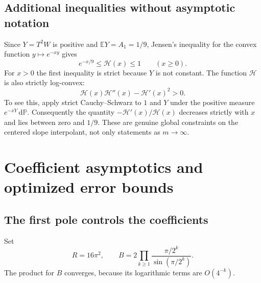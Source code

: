 \documentclass[11pt,a4paper]{article}
\numberwithin{equation}{section}
\theoremstyle{definition}
\theoremstyle{remark}
\newcommand{\E}{\mathbb E}
\newcommand{\dd}{\,\mathrm d}
\newcommand{\calH}{\mathcal H}
\begin{document}
\subsection{Additional inequalities without asymptotic notation}
Since $Y=T^2W$ is positive and $\E Y=A_1=1/9$, Jensen's inequality
for the convex function $y\mapsto e^{-xy}$ gives
\begin{equation}
 e^{-x/9}\le\calH(x)\le1\qquad(x\ge0).
 \label{eq:Jensen}
\end{equation}
For $x>0$ the first inequality is strict because $Y$ is not
constant. The function $\calH$ is also strictly log-convex:
\begin{equation}
 \calH(x)\calH''(x)-\calH'(x)^2>0.
 \label{eq:calH-logconvex}
\end{equation}
To see this, apply strict Cauchy--Schwarz to $1$ and $Y$ under the
positive measure $e^{-xY}\dd\mathbb P$. Consequently the quantity
$-\calH'(x)/\calH(x)$ decreases strictly with $x$ and lies between
zero and $1/9$. These are genuine global constraints on the centered
slope interpolant, not only statements as $m\to\infty$.

\section{Coefficient asymptotics and optimized error bounds}
\label{sec:optimal}

\subsection{The first pole controls the coefficients}
Set
\begin{equation}
 R=16\pi^2,\qquad
 B=2\prod_{k\ge1}\frac{\pi/2^k}{\sin(\pi/2^k)}.
 \label{eq:RB}
\end{equation}
The product for $B$ converges, because its logarithmic terms are
$O(4^{-k})$.
\end{document}
